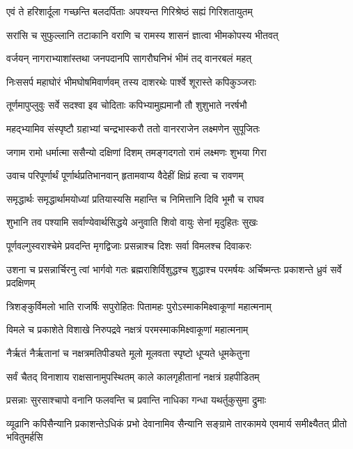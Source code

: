 \twolineshloka
{एवं ते हरिशार्दूला गच्छन्ति बलदर्पिताः}
{अपश्यन्त गिरिश्रेष्ठं सह्यं गिरिशतायुतम्} %

\twolineshloka
{सरांसि च सुफुल्लानि तटाकानि वराणि च}
{रामस्य शासनं ज्ञात्वा भीमकोपस्य भीतवत्} %

\twolineshloka
{वर्जयन् नागराभ्याशांस्तथा जनपदानपि}
{सागरौघनिभं भीमं तद् वानरबलं महत्} %

\twolineshloka
{निःससर्प महाघोरं भीमघोषमिवार्णवम्}
{तस्य दाशरथेः पार्श्वे शूरास्ते कपिकुञ्जराः} %

\twolineshloka
{तूर्णमापुप्लुवुः सर्वे सदश्वा इव चोदिताः}
{कपिभ्यामुह्यमानौ तौ शुशुभाते नरर्षभौ} %

\twolineshloka
{महद्भ्यामिव संस्पृष्टौ ग्रहाभ्यां चन्द्रभास्करौ}
{ततो वानरराजेन लक्ष्मणेन सुपूजितः} %

\twolineshloka
{जगाम रामो धर्मात्मा ससैन्यो दक्षिणां दिशम्}
{तमङ्गदगतो रामं लक्ष्मणः शुभया गिरा} %

\twolineshloka
{उवाच परिपूर्णार्थं पूर्णार्थप्रतिभानवान्}
{हृतामवाप्य वैदेहीं क्षिप्रं हत्वा च रावणम्} %

\twolineshloka
{समृद्धार्थः समृद्धार्थामयोध्यां प्रतियास्यसि}
{महान्ति च निमित्तानि दिवि भूमौ च राघव} %

\twolineshloka
{शुभानि तव पश्यामि सर्वाण्येवार्थसिद्धये}
{अनुवाति शिवो वायुः सेनां मृदुहितः सुखः} %

\twolineshloka
{पूर्णवल्गुस्वराश्चेमे प्रवदन्ति मृगद्विजाः}
{प्रसन्नाश्च दिशः सर्वा विमलश्च दिवाकरः} %

\threelineshloka
{उशना च प्रसन्नार्चिरनु त्वां भार्गवो गतः}
{ब्रह्मराशिर्विशुद्धश्च शुद्धाश्च परमर्षयः}
{अर्चिष्मन्तः प्रकाशन्ते ध्रुवं सर्वे प्रदक्षिणम्} %

\twolineshloka
{त्रिशङ्कुर्विमलो भाति राजर्षिः सपुरोहितः}
{पितामहः पुरोऽस्माकमिक्ष्वाकूणां महात्मनाम्} %

\twolineshloka
{विमले च प्रकाशेते विशाखे निरुपद्रवे}
{नक्षत्रं परमस्माकमिक्ष्वाकूणां महात्मनाम्} %

\twolineshloka
{नैर्ऋतं नैर्ऋतानां च नक्षत्रमतिपीड्यते}
{मूलो मूलवता स्पृष्टो धूप्यते धूमकेतुना} %

\twolineshloka
{सर्वं चैतद् विनाशाय राक्षसानामुपस्थितम्}
{काले कालगृहीतानां नक्षत्रं ग्रहपीडितम्} %

\twolineshloka
{प्रसन्नाः सुरसाश्चापो वनानि फलवन्ति च}
{प्रवान्ति नाधिका गन्धा यथर्तुकुसुमा द्रुमाः} %

\threelineshloka
{व्यूढानि कपिसैन्यानि प्रकाशन्तेऽधिकं प्रभो}
{देवानामिव सैन्यानि सङ्ग्रामे तारकामये}
{एवमार्य समीक्ष्यैतत् प्रीतो भवितुमर्हसि} %

